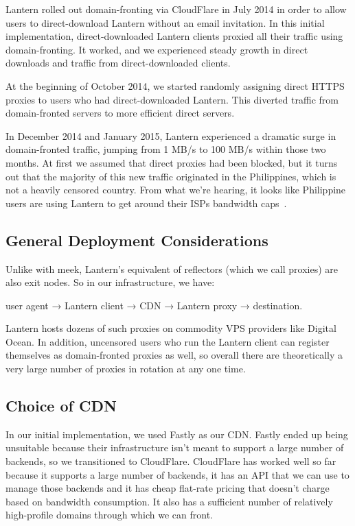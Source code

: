 \documentclass{sig-alternate}
\begin{document}
Lantern rolled out domain-fronting via CloudFlare in July 2014 in order to
allow users to direct-download Lantern without an email invitation.  In
this initial implementation, direct-downloaded Lantern clients proxied all
their traffic using domain-fronting.  It worked, and we experienced steady
growth in direct downloads and traffic from direct-downloaded clients.

At the beginning of October 2014, we started randomly assigning direct
HTTPS proxies to users who had direct-downloaded Lantern.  This diverted
traffic from domain-fronted servers to more efficient direct servers.

In December 2014 and January 2015, Lantern experienced a dramatic surge in
domain-fronted traffic, jumping from 1 MB/s to 100 MB/s within those two
months. At first we assumed that direct proxies had been blocked, but it
turns out that the majority of this new traffic originated in the
Philippines, which is not a heavily censored country. From what we're
hearing, it looks like Philippine users are using Lantern to get around
their ISPs bandwidth caps~\cite{needed}.

\subsection{General Deployment Considerations}

Unlike with meek, Lantern's equivalent of reflectors (which we call
proxies) are also exit nodes.  So in our infrastructure, we have:

user agent → Lantern client → CDN → Lantern proxy → destination.

Lantern hosts dozens of such proxies on commodity VPS providers like
Digital Ocean. In addition, uncensored users who run the Lantern client can
register themselves as domain-fronted proxies as well, so overall there are
theoretically a very large number of proxies in rotation at any one time.

\subsection{Choice of CDN}
In our initial implementation, we used Fastly as our CDN.  Fastly ended up
being unsuitable because their infrastructure isn't meant to support a
large number of backends, so we transitioned to CloudFlare.  CloudFlare has
worked well so far because it supports a large number of backends, it has
an API that we can use to manage those backends and it has cheap flat-rate
pricing that doesn't charge based on bandwidth consumption. It also has
a sufficient number of relatively high-profile domains through which we can
front.
\end{document}

